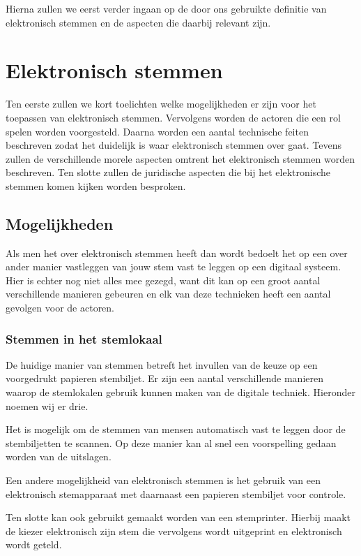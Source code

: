 \documentclass[a4paper]{article}
\begin{document}
Hierna zullen we eerst verder ingaan op de door ons gebruikte definitie van elektronisch stemmen en de aspecten die daarbij relevant zijn.

\newpage

\section{Elektronisch stemmen}
\label{text:elektronisch_stemmen}
Ten eerste zullen we kort toelichten welke mogelijkheden er zijn voor het toepassen van elektronisch stemmen. 
Vervolgens worden de actoren die een rol spelen worden voorgesteld. 
Daarna worden een aantal technische feiten beschreven zodat het duidelijk is waar elektronisch stemmen over gaat.
Tevens zullen de verschillende morele aspecten omtrent het elektronisch stemmen worden beschreven.
Ten slotte zullen de juridische aspecten die bij het elektronische stemmen komen kijken worden besproken.

\subsection{Mogelijkheden}
Als men het over elektronisch stemmen heeft dan wordt bedoelt het op een over ander manier vastleggen van jouw stem vast te leggen op een digitaal systeem.
Hier is echter nog niet alles mee gezegd, want dit kan op een groot aantal verschillende manieren gebeuren en elk van deze technieken heeft een aantal gevolgen voor de actoren. 

\subsubsection{Stemmen in het stemlokaal}
De huidige manier van stemmen betreft het invullen van de keuze op een voorgedrukt papieren stembiljet. 
Er zijn een aantal verschillende manieren waarop de stemlokalen gebruik kunnen maken van de digitale techniek.
Hieronder noemen wij er drie. 

Het is mogelijk om de stemmen van mensen automatisch vast te leggen door de stembiljetten te scannen.
Op deze manier kan al snel een voorspelling gedaan worden van de uitslagen. 

Een andere mogelijkheid van elektronisch stemmen is het gebruik van een elektronisch stemapparaat met daarnaast een papieren stembiljet voor controle.

Ten slotte kan ook gebruikt gemaakt worden van een stemprinter. 
Hierbij maakt de kiezer elektronisch zijn stem die vervolgens wordt uitgeprint en elektronisch wordt geteld.
\end{document}
